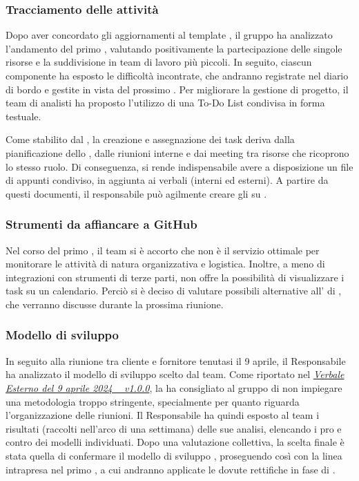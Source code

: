 \subsubsection{Tracciamento delle attività}
\par Dopo aver concordato gli aggiornamenti al template , il gruppo ha analizzato l'andamento del primo , valutando positivamente la partecipazione delle singole risorse e la suddivisione in team di lavoro più piccoli. In seguito, ciascun componente ha esposto le difficoltà incontrate, che andranno registrate nel diario di bordo e gestite in vista del prossimo . Per migliorare la gestione di progetto, il team di analisti ha proposto l’utilizzo di una To-Do List condivisa in forma testuale.
\par Come stabilito dal \glossario{\WoW}, la creazione e assegnazione dei task deriva dalla pianificazione dello , dalle riunioni interne e dai meeting tra risorse che ricoprono lo stesso ruolo. Di conseguenza, si rende indispensabile avere a disposizione un file di appunti condiviso, in aggiunta ai verbali (interni ed esterni). A partire da questi documenti, il responsabile può agilmente creare gli  su .

\subsubsection{Strumenti da affiancare a GitHub}
\par Nel corso del primo , il team si è accorto che  non è il servizio ottimale per monitorare le attività di natura organizzativa e logistica. Inoltre, a meno di integrazioni con strumenti di terze parti,  non offre la possibilità di visualizzare i task su un calendario. Perciò si è deciso di valutare possibili alternative all' di , che verranno discusse durante la prossima riunione.

\subsubsection{Modello di sviluppo}
\par In seguito alla riunione tra cliente e fornitore tenutasi il 9 aprile, il Responsabile ha analizzato il modello di sviluppo scelto dal team. Come riportato nel \href{https://argo-swe.github.io/2 - RTB/Verbali/Esterni/VerbaleEsterno_2024-04-09.pdf}{\emph{Verbale Esterno del 9 aprile 2024 \  v1.0.0}}, la  ha consigliato al gruppo di non impiegare una metodologia troppo stringente, specialmente per quanto riguarda l'organizzazione delle riunioni. Il Responsabile ha quindi esposto al team i risultati (raccolti nell'arco di una settimana) delle sue analisi, elencando i pro e contro dei modelli individuati. Dopo una valutazione collettiva, la scelta finale è stata quella di confermare il modello di sviluppo , proseguendo così con la linea intrapresa nel primo , a cui andranno applicate le dovute rettifiche in fase di .


